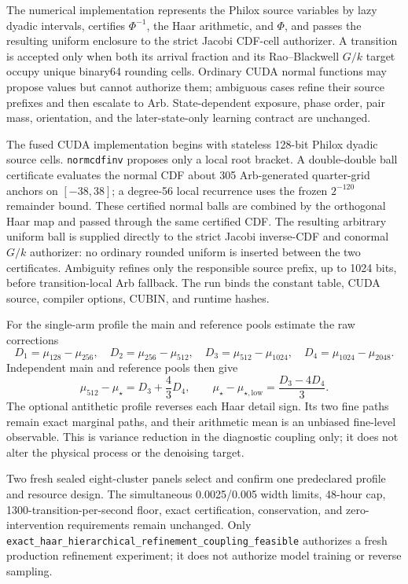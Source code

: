 \documentclass[11pt]{article}
\numberwithin{equation}{section}
\newcommand{\1}{\mathbf 1}
\begin{document}
The numerical implementation represents the Philox source variables by
lazy dyadic intervals, certifies \(\Phi^{-1}\), the Haar arithmetic, and
\(\Phi\), and passes the resulting uniform enclosure to the strict Jacobi
CDF-cell authorizer.  A transition is accepted only when both its arrival
fraction and its Rao--Blackwell \(G/k\) target occupy unique binary64
rounding cells.  Ordinary CUDA normal functions may propose values but
cannot authorize them; ambiguous cases refine their source prefixes and
then escalate to Arb.  State-dependent exposure, phase order, pair mass,
orientation, and the later-state-only learning contract are unchanged.

The fused CUDA implementation begins with stateless 128-bit Philox dyadic
source cells.  \texttt{normcdfinv} proposes only a local root bracket.  A
double-double ball certificate evaluates the normal CDF about 305
Arb-generated quarter-grid anchors on \([-38,38]\); a degree-56 local
recurrence uses the frozen \(2^{-120}\) remainder bound.  These certified
normal balls are combined by the orthogonal Haar map and passed through the
same certified CDF.  The resulting arbitrary uniform ball is supplied
directly to the strict Jacobi inverse-CDF and conormal \(G/k\) authorizer:
no ordinary rounded uniform is inserted between the two certificates.
Ambiguity refines only the responsible source prefix, up to 1024 bits,
before transition-local Arb fallback.  The run binds the constant table,
CUDA source, compiler options, CUBIN, and runtime hashes.

For the single-arm profile the main and reference pools estimate the raw
corrections
\[
 D_1=\mu_{128}-\mu_{256},\quad
 D_2=\mu_{256}-\mu_{512},\quad
 D_3=\mu_{512}-\mu_{1024},\quad
 D_4=\mu_{1024}-\mu_{2048}.
\]
Independent main and reference pools then give
\begin{equation}
 \mu_{512}-\mu_\star=D_3+\frac43D_4,
 \qquad
 \mu_\star-\mu_{\star,\mathrm{low}}=\frac{D_3-4D_4}{3}.
 \label{eq:d0-haar-richardson-differences}
\end{equation}
The optional antithetic profile reverses each Haar detail sign.  Its two
fine paths remain exact marginal paths, and their arithmetic mean is an
unbiased fine-level observable.  This is variance reduction in the
diagnostic coupling only; it does not alter the physical process or the
denoising target.

Two fresh sealed eight-cluster panels select and confirm one predeclared
profile and resource design.  The simultaneous 0.0025/0.005 width limits,
48-hour cap, 1300-transition-per-second floor, exact certification,
conservation, and zero-intervention requirements remain unchanged.  Only
\nolinkurl{exact_haar_hierarchical_refinement_coupling_feasible} authorizes
a fresh production refinement experiment; it does not authorize model
training or reverse sampling.
\end{document}

